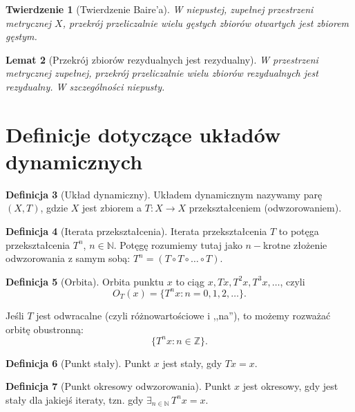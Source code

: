 \documentclass[licencjacka]{pwr_wmat_praca_dyplomowa}
\theoremstyle{plain}
\newtheorem{theorem}{Twierdzenie}
\numberwithin{theorem}{chapter}
\newtheorem{lemma}[theorem]{Lemat}
\theoremstyle{definition}
\numberwithin{theorem}{chapter}
\newtheorem{definition}[theorem]{Definicja}
\begin{document}
\begin{theorem}[Twierdzenie Baire'a]
\label{twierdzenie_bairea}
W niepustej, zupełnej przestrzeni metrycznej $X$, przekrój przeliczalnie wielu gęstych zbiorów otwartych jest zbiorem gęstym.
\end{theorem}


\begin{lemma}[Przekrój zbiorów rezydualnych jest rezydualny] \label{przekroj_rezydualnych_jest_rezydualny}
W przestrzeni metrycznej zupełnej, przekrój przeliczalnie wielu zbiorów rezydualnych jest rezydualny. W szczególności niepusty.
\end{lemma}



\section{Definicje dotyczące układów dynamicznych}

\begin{definition}[Układ dynamiczny]
Układem dynamicznym nazywamy parę $(X, T)$, gdzie $X$ jest zbiorem a $T:X \rightarrow X$ przekształceniem (odwzorowaniem).
\end{definition}

\begin{definition}[Iterata przekształcenia]
Iterata przekształcenia $T$ to potęga przekształcenia $T^n$, $n \in \mathbb{N}$. Potęgę rozumiemy tutaj jako $n-$krotne złożenie odwzorowania z samym sobą: $T^n = (T \circ T \circ \ldots \circ T).$
\end{definition}

\begin{definition}[Orbita]
Orbita punktu $x$ to ciąg $x, Tx, T^2x, T^3x,\ldots$, czyli 
$$O_T(x) = \{T^nx: n=0,1,2,\ldots\}.$$

Jeśli $T$ jest odwracalne (czyli różnowartościowe i ,,na''), to możemy rozważać orbitę obustronną:
$$\{T^nx: n \in \mathbb{Z}\}.$$
\end{definition}

\begin{definition}[Punkt stały]
Punkt $x$ jest stały, gdy $Tx = x$.
\end{definition}

\begin{definition}[Punkt okresowy odwzorowania]
Punkt $x$ jest okresowy, gdy jest stały dla jakiejś iteraty, tzn. gdy $\exists_{n \in \mathbb{N}} \, T^nx = x$.
\end{definition}
\end{document}
